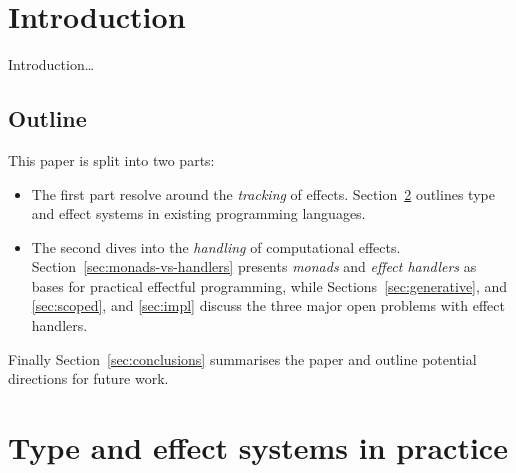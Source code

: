 \documentclass[preprint,9pt,numbers]{sigplanconf}
\title{\thetitle{}}
\begin{document}
\makeatletter
\def\@copyrightspace{\relax}
\makeatother

\preprintfooter{} %

\setlength{\pdfpageheight}{\paperheight}
\setlength{\pdfpagewidth}{\paperwidth}

\maketitle

\begin{abstract}
  Many programs are by nature effectful: they interact with one
  another, manage their own internal state, cause and handle faults,
  and so forth. 
\end{abstract}

\section{Introduction}
Introduction\dots

\subsection{Outline}
This paper is split into two parts:
\begin{itemize}
\item The first part resolve around the \emph{tracking} of
  effects. Section~\ref{sec:effpractice} outlines type and effect
  systems in existing programming languages.
\item The second dives into the \emph{handling} of computational
  effects. Section~\ref{sec:monads-vs-handlers} presents \emph{monads}
  and \emph{effect handlers} as bases for practical effectful
  programming, while Sections~\ref{sec:generative}, and
  \ref{sec:scoped}, and \ref{sec:impl} discuss the three major open
  problems with effect handlers.
\end{itemize}
Finally Section~\ref{sec:conclusions} summarises the paper and outline
potential directions for future work.


\section{Type and effect systems in practice}
\label{sec:effpractice}
\end{document}
